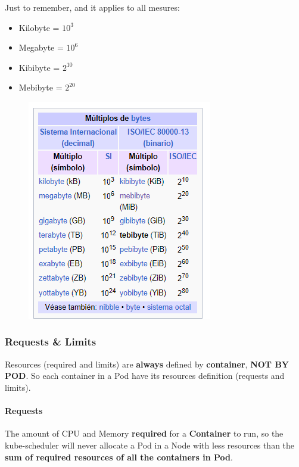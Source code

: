 \documentclass{article}
\newenvironment{blocktemplateI}[1]{%
    \tcolorbox[beamer,%
    noparskip,breakable,
    colframe=Violet,%
    colbacklower=Black,%
    title=#1]}%
    {\endtcolorbox}
\newenvironment{blocktemplateIII}[1]{%
    \tcolorbox[beamer,%
    noparskip,breakable,
    ,colframe=Red,%
    colbacklower=LimeGreen!75!LightGreen,%
    title=#1]}%
    {\endtcolorbox}
\begin{document}
\begin{blocktemplateI}{NOTE}
Just to remember, and it applies to all mesures:
\begin{itemize}
    \item Kilobyte = $10^3$
    \item Megabyte = $10^6$
    \item Kibibyte = $2^{10}$
    \item Mebibyte = $2^{20}$
\end{itemize}

\begin{figure}[H]
    \includegraphics[scale=0.6]{pictures/bib.png}
\end{figure}
\end{blocktemplateI}

\subsubsection{Requests \& Limits}

\begin{blocktemplateIII}{WARNING}
Resources (required and limits) are \textbf{always} defined by \textbf{container}, \textbf{NOT BY POD}. So each container in a Pod have its resources definition (requests and limits).
\end{blocktemplateIII}

\paragraph{Requests}

The amount of CPU and Memory \textbf{required} for a \textbf{Container} to run, so the kube-scheduler will never allocate a Pod in a Node with less resources than the \textbf{sum of required resources of all the containers in Pod}.
\end{document}
